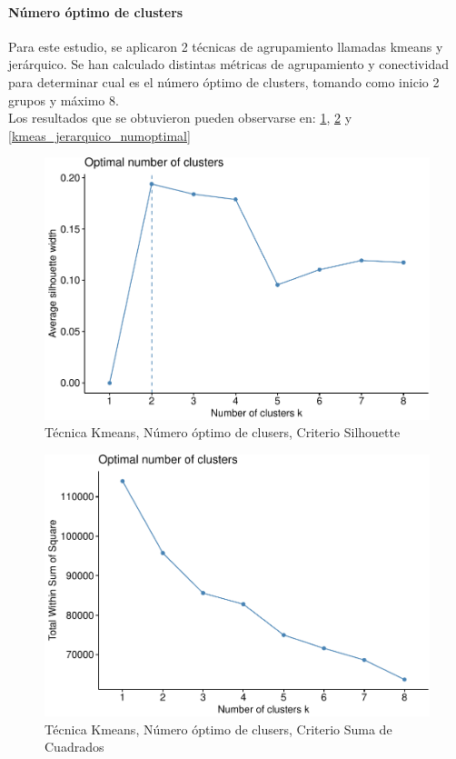 \paragraph{\textbf{Número óptimo de clusters}} \label{estudio-del-numero-optimo-de-clusters}
Para este estudio, se aplicaron 2 técnicas de agrupamiento llamadas kmeans y jerárquico. Se han calculado distintas métricas de agrupamiento y conectividad para determinar cual es el número óptimo de clusters, tomando como inicio 2 grupos y máximo 8.\\

Los resultados que se obtuvieron pueden observarse en: \ref{fig:kmeans_numoptimal_silhouette},  \ref{fig:kmeans_numoptimal_sumsquare} y \ref{kmeas_jerarquico_numoptimal}

\begin{figure}[!htb]
	\centering
	\includegraphics{imagenes/modelo_clusters/unnamed-chunk-15-1.pdf}
	\caption{Técnica Kmeans, Número óptimo de clusers, Criterio Silhouette}
	\label{fig:kmeans_numoptimal_silhouette}
\end{figure}

\begin{figure}[!htb]
	\centering
	\includegraphics{imagenes/modelo_clusters/unnamed-chunk-15-2.pdf}
	\caption{Técnica Kmeans, Número óptimo de clusers, Criterio Suma de Cuadrados}
	\label{fig:kmeans_numoptimal_sumsquare}
\end{figure}

